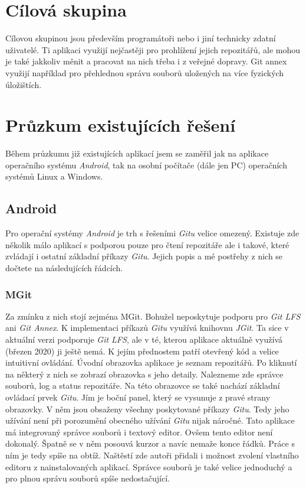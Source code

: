 \section{Cílová skupina}
Cílovou skupinou jsou především programátoři nebo i jiní technicky zdatní uživatelé. Ti aplikaci využijí nejčastěji pro prohlížení jejich repozitářů, ale mohou je také jakkoliv měnit a pracovat na nich třeba i z veřejné dopravy. Git annex využijí například pro přehlednou správu souborů uložených na více fyzických úložištích.

\section{Průzkum existujících řešení}
Během průzkumu již existujících aplikací jsem se zaměřil jak na aplikace operačního systému \emph{Android}, tak na osobní počítače (dále jen PC) operačních systémů Linux a Windows.

    \subsection {Android}
    Pro operační systémy \emph{Android} je trh s řešeními \emph{Gitu} velice omezený. Existuje zde několik málo aplikací s podporou pouze pro čtení repozitáře ale i takové, které zvládají i ostatní základní příkazy \emph{Gitu}. Jejich popis a mé postřehy z nich se dočtete na následujících řádcích.

        \subsubsection{MGit~}
        Za zmínku z nich stojí zejména MGit. Bohužel neposkytuje podporu pro \emph{Git LFS} ani \emph{Git Annex}. K implementaci příkazů \emph{Gitu} využívá knihovnu \emph{JGit}. Ta sice v aktuální verzi podporuje \emph{Git LFS}, ale v té, kterou aplikace aktuálně využívá (březen 2020) ji ještě nemá. K jejím přednostem patří otevřený kód a velice intuitivní ovládání.
        Úvodní obrazovka aplikace je seznam repozitářů. Po kliknutí na některý z nich se zobrazí obrazovka s jeho detaily. Nalezneme zde správce souborů, log a status repozitáře. Na této obrazovce se také nachází základní ovládací prvek \emph{Gitu}. Jím je boční panel, který se vysunuje z pravé strany obrazovky. V něm jsou obsaženy všechny poskytované příkazy \emph{Gitu}. Tedy jeho užívání není při porozumění obecného užívání \emph{Gitu} nijak náročné. Tato aplikace má integrovaný správce souborů i textový editor. Ovšem tento editor není dokonalý. Špatně se v něm posouvá kurzor a navíc nemaže konce řádků. Práce s ním je tedy spíše na obtíž. Naštěstí zde autoři přidali i možnost zvolení vlastního editoru z nainstalovaných aplikací. Správce souborů je také velice jednoduchý a pro plnou správu souborů spíše nedostačující.

